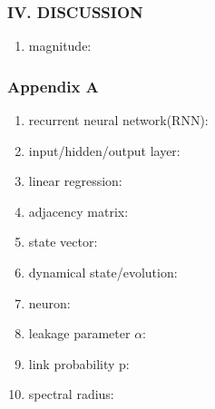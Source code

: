 \subsubsection{IV. DISCUSSION}
\begin{enumerate}
  \item magnitude: 
\end{enumerate}

\subsubsection{Appendix A}
\begin{enumerate}
  \item recurrent neural network(RNN):
  \item input/hidden/output layer: 
  \item linear regression: 
  \item adjacency matrix:
  \item state vector: 
  \item dynamical state/evolution: 
  \item neuron:
  \item leakage parameter $\alpha$:
  \item link probability p: 
  \item spectral radius:
\end{enumerate}

\clearpage